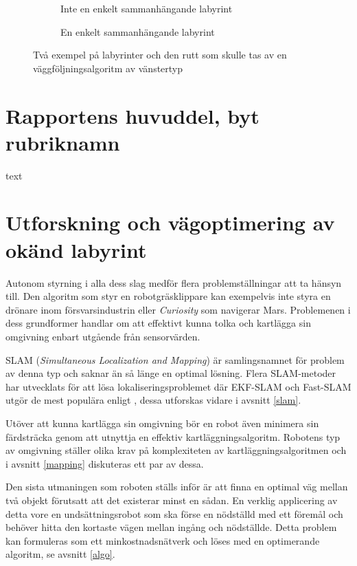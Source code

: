 \documentclass[11pt]{article}
\begin{document}
\begin{flushleft}
\begin{figure}[htbp]
	\centering
	\begin{subfigure}{.5\linewidth}
		\centering
		\noindent\resizebox{.5\textwidth}{!}{
			}
		\caption{Inte en enkelt sammanhängande labyrint}	
		\label{non-connected}
	\end{subfigure}%
	\begin{subfigure}{.5\linewidth}
		\centering
		\noindent\resizebox{.5\textwidth}{!}{
			}
		\caption{En enkelt sammanhängande labyrint}	
	\end{subfigure}%
	\caption{Två exempel på labyrinter och den rutt som skulle tas av en väggföljningsalgoritm av vänstertyp}
	\label{maze}
\end{figure}%



\pagebreak
\section{Rapportens huvuddel, byt rubriknamn}
text

\pagebreak
\section{Utforskning och vägoptimering av okänd labyrint}
Autonom styrning i alla dess slag medför flera problemställningar att ta hänsyn till. Den algoritm som styr en robotgräsklippare kan exempelvis inte styra en drönare inom försvarsindustrin eller \emph{Curiosity} som navigerar Mars. Problemenen i dess grundformer handlar om att effektivt kunna tolka och kartlägga sin omgivning enbart utgående från sensorvärden.

SLAM (\emph{Simultaneous Localization and Mapping}) är samlingsnamnet för problem av denna typ och saknar än så länge en optimal lösning. Flera SLAM-metoder har utvecklats för att lösa lokaliseringsproblemet där EKF-SLAM och Fast-SLAM utgör de mest populära enligt \cite{rat}, dessa utforskas vidare i avsnitt \ref{slam}.

Utöver att kunna kartlägga sin omgivning bör en robot även minimera sin färdsträcka genom att utnyttja en effektiv kartläggningsalgoritm. Robotens typ av omgivning ställer olika krav på komplexiteten av kartläggningsalgoritmen och i avsnitt \ref{mapping} diskuteras ett par av dessa.

Den sista utmaningen som roboten ställs inför är att finna en optimal väg mellan två objekt förutsatt att det existerar minst en sådan. En verklig applicering av detta vore en undsättningsrobot som ska förse en nödställd med ett föremål och behöver hitta den kortaste vägen mellan ingång och nödställde. Detta problem kan formuleras som ett minkostnadsnätverk och löses med en optimerande algoritm, se avsnitt \ref{algo}. 


\end{flushleft}
\end{document}
